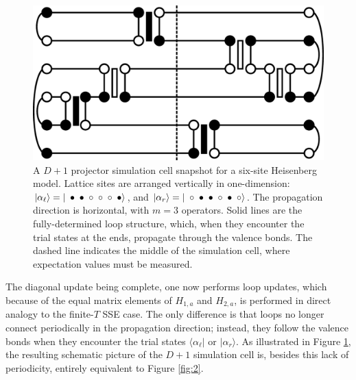 \documentclass[vecphys]{svmult}
\begin{document}
\begin{figure}[t]
\centering
\includegraphics*[width=.85\textwidth]{zeroT_heis.eps}
\caption[]{A $D+1$ projector simulation cell snapshot for a six-site Heisenberg model.  Lattice sites are arranged vertically in one-dimension: 
$| \alpha_{\ell} \rangle = |  \hspace{1mm} \bullet  \hspace{1mm} \bullet  \hspace{1mm} \circ  \hspace{1mm} \circ  \hspace{1mm} \circ  \hspace{1mm} \bullet  \rangle$, and  $| \alpha_{r} \rangle = |  \hspace{1mm} \circ  \hspace{1mm} \bullet  \hspace{1mm} \bullet  \hspace{1mm} \circ  \hspace{1mm} \bullet  \hspace{1mm} \circ  \rangle$.
The propagation direction is horizontal, with $m=3$ operators.  Solid lines are the fully-determined loop structure, which, when they encounter the trial states at the ends, propagate through the valence bonds.  The dashed line indicates the middle of the simulation cell, where expectation values must be measured.}
\label{fig:3}       %
\end{figure} 

The diagonal update being complete, one now performs loop updates, which because of the equal matrix elements of $H_{1,a}$ and $H_{2,a}$, is performed in direct analogy to the finite-$T$ SSE case.  The only difference is that loops no longer connect periodically in the propagation direction; instead, they follow the valence bonds when they encounter the trial states $\langle \alpha_{\ell} |$ or $| \alpha_r \rangle$.  As illustrated in Figure \ref{fig:3}, the resulting schematic picture of the $D+1$ simulation cell is, besides this lack of periodicity, entirely equivalent to Figure \ref{fig:2}.
\end{document}

